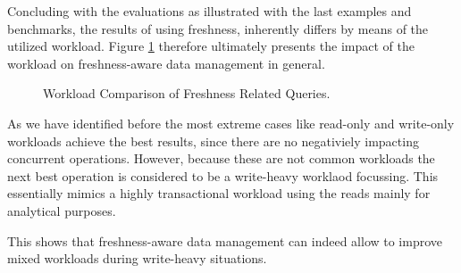 
Concluding with the evaluations as illustrated with the last examples and benchmarks, the results of using freshness, inherently differs by means of the utilized workload.
Figure \ref{fig:workload_comp} therefore ultimately presents the impact of the workload on freshness-aware data management in general. 

\begin{figure}[t] 
    \centering 
    \caption{Workload Comparison of Freshness Related Queries.}
    \label{fig:workload_comp}
\end{figure}

As we have identified before the most extreme cases like read-only and write-only workloads achieve the best results,
since there are no negativiely impacting concurrent operations.
However, because these are not common workloads the next best operation is considered to be a write-heavy worklaod focussing.
This essentially mimics a highly transactional workload using the reads mainly for analytical purposes.


This shows that freshness-aware data management can indeed allow to improve mixed workloads during write-heavy situations.




